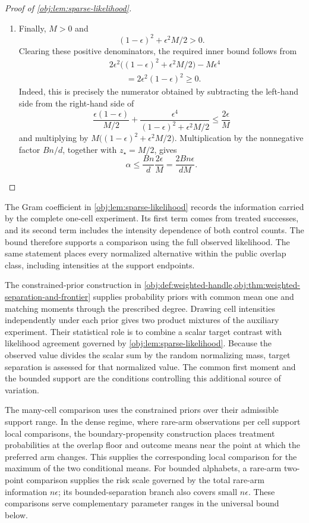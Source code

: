 \documentclass[11pt]{article}
\begin{document}
\begin{proof}[Proof of \cref{obj:lem:sparse-likelihood}]
\begin{enumerate}
\item Finally, \(M>0\) and
\[
(1-\epsilon)^2+\epsilon^2M/2>0.
\]
Clearing these positive denominators, the required inner bound follows from
\[
\begin{aligned}
&2\epsilon^2\bigl((1-\epsilon)^2+\epsilon^2M/2\bigr)
-M\epsilon^4\\
&\qquad=2\epsilon^2(1-\epsilon)^2\ge0.
\end{aligned}
\]
Indeed, this is precisely the numerator obtained by subtracting the left-hand side from the right-hand side of
\[
\frac{\epsilon(1-\epsilon)}{M/2}
+\frac{\epsilon^4}{(1-\epsilon)^2+\epsilon^2M/2}
\le\frac{2\epsilon}{M}
\]
and multiplying by \(M\bigl((1-\epsilon)^2+\epsilon^2M/2\bigr)\).
Multiplication by the nonnegative factor \(Bn/d\), together with \(z_\star=M/2\), gives
\[
\alpha
\le\frac{Bn}{d}\frac{2\epsilon}{M}
=\frac{2Bn\epsilon}{dM}.
\]
\end{enumerate}
\end{proof}

The Gram coefficient  in \cref{obj:lem:sparse-likelihood} records the information carried by the complete one-cell experiment. Its first term comes from treated successes, and its second term includes the intensity dependence of both control counts. The bound therefore supports a comparison using the full observed likelihood. The same statement places every normalized alternative within the public overlap class, including intensities at the support endpoints.

The constrained-prior construction in \cref{obj:def:weighted-handle,obj:thm:weighted-separation-and-frontier} supplies probability priors with common mean one and matching moments through the prescribed degree. Drawing cell intensities independently under each prior gives two product mixtures of the auxiliary experiment. Their statistical role is to combine a scalar target contrast with likelihood agreement governed by \cref{obj:lem:sparse-likelihood}. Because the observed value divides the scalar sum by the random normalizing mass, target separation is assessed for that normalized value. The common first moment and the bounded support are the conditions controlling this additional source of variation.

The many-cell comparison uses the constrained priors over their admissible support range. In the dense regime, where rare-arm observations per cell support local comparisons, the boundary-propensity construction places treatment probabilities at the overlap floor and outcome means near the point at which the preferred arm changes. This supplies the corresponding local comparison for the maximum of the two conditional means. For bounded alphabets, a rare-arm two-point comparison supplies the risk scale governed by the total rare-arm information \(n\epsilon\); its bounded-separation branch also covers small \(n\epsilon\). These comparisons serve complementary parameter ranges in the universal bound below.
\end{document}
